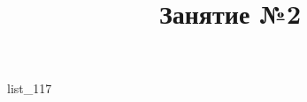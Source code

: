 \documentclass[12pt, a4paper]{article}
\begin{document}
	\title{Занятие №2}
	{list_117}
\end{document}

